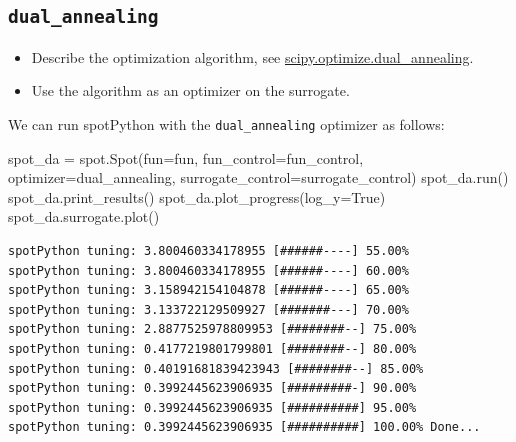 \documentclass[
  letterpaper,
  DIV=11,
  numbers=noendperiod]{scrreprt}
\newenvironment{Shaded}{\begin{snugshade}}{\end{snugshade}}
\newcommand{\NormalTok}[1]{\textcolor[rgb]{0.00,0.23,0.31}{#1}}
\newcommand{\OperatorTok}[1]{\textcolor[rgb]{0.37,0.37,0.37}{#1}}
\newcommand{\VariableTok}[1]{\textcolor[rgb]{0.07,0.07,0.07}{#1}}
\providecommand{\tightlist}{%
  \setlength{\itemsep}{0pt}\setlength{\parskip}{0pt}}\usepackage{longtable,booktabs,array}
\begin{document}
\subsection{\texorpdfstring{\texttt{dual\_annealing}}{dual\_annealing}}\label{dual_annealing}

\begin{itemize}
\tightlist
\item
  Describe the optimization algorithm, see
  \href{https://docs.scipy.org/doc/scipy/reference/generated/scipy.optimize.dual_annealing.html}{scipy.optimize.dual\_annealing}.
\item
  Use the algorithm as an optimizer on the surrogate.
\end{itemize}

\begin{tcolorbox}[enhanced jigsaw, coltitle=black, bottomrule=.15mm, breakable, toprule=.15mm, colframe=quarto-callout-tip-color-frame, title=\textcolor{quarto-callout-tip-color}{\faLightbulb}\hspace{0.5em}{Tip: Selecting the Optimizer for the Surrogate}, colbacktitle=quarto-callout-tip-color!10!white, opacityback=0, left=2mm, leftrule=.75mm, colback=white, rightrule=.15mm, bottomtitle=1mm, toptitle=1mm, titlerule=0mm, arc=.35mm, opacitybacktitle=0.6]

We can run spotPython with the \texttt{dual\_annealing} optimizer as
follows:

\begin{Shaded}
\begin{Highlighting}[]
\NormalTok{spot\_da }\OperatorTok{=}\NormalTok{ spot.Spot(fun}\OperatorTok{=}\NormalTok{fun,}
\NormalTok{                    fun\_control}\OperatorTok{=}\NormalTok{fun\_control,}
\NormalTok{                    optimizer}\OperatorTok{=}\NormalTok{dual\_annealing,}
\NormalTok{                    surrogate\_control}\OperatorTok{=}\NormalTok{surrogate\_control)}
\NormalTok{spot\_da.run()}
\NormalTok{spot\_da.print\_results()}
\NormalTok{spot\_da.plot\_progress(log\_y}\OperatorTok{=}\VariableTok{True}\NormalTok{)}
\NormalTok{spot\_da.surrogate.plot()}
\end{Highlighting}
\end{Shaded}

\begin{verbatim}
spotPython tuning: 3.800460334178955 [######----] 55.00% 
spotPython tuning: 3.800460334178955 [######----] 60.00% 
spotPython tuning: 3.158942154104878 [######----] 65.00% 
spotPython tuning: 3.133722129509927 [#######---] 70.00% 
spotPython tuning: 2.8877525978809953 [########--] 75.00% 
spotPython tuning: 0.4177219801799801 [########--] 80.00% 
spotPython tuning: 0.40191681839423943 [########--] 85.00% 
spotPython tuning: 0.3992445623906935 [#########-] 90.00% 
spotPython tuning: 0.3992445623906935 [##########] 95.00% 
spotPython tuning: 0.3992445623906935 [##########] 100.00% Done...


\end{verbatim}
\end{tcolorbox}
\end{document}
